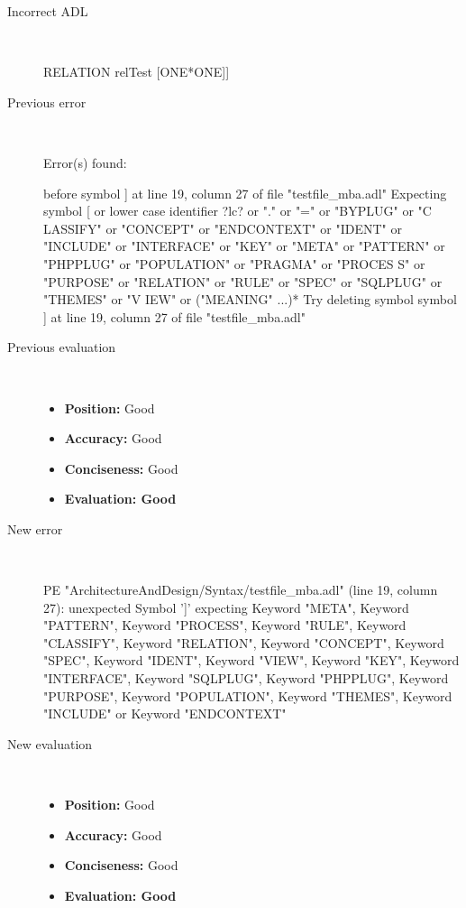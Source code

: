 \begin{description}
  \item[Incorrect ADL]~\\
\begin{adl}
RELATION relTest [ONE*ONE]]\end{adl}
  \item[Previous error]~\\
\begin{haskell}
Error(s) found:

before symbol ] at line 19, column 27 of file "testfile_mba.adl"
Expecting symbol [ or lower case identifier ?lc? or "." or "=" or "BYPLUG" or "C
LASSIFY" or "CONCEPT" or "ENDCONTEXT" or "IDENT" or "INCLUDE" or "INTERFACE" or
"KEY" or "META" or "PATTERN" or "PHPPLUG" or "POPULATION" or "PRAGMA" or "PROCES
S" or "PURPOSE" or "RELATION" or "RULE" or "SPEC" or "SQLPLUG" or "THEMES" or "V
IEW" or ("MEANING" ...)*
Try deleting symbol symbol ] at line 19, column 27 of file "testfile_mba.adl"\end{haskell}
  \item[Previous evaluation]~\\
    \begin{itemize}
    \item \textbf{Position:} Good
    \item \textbf{Accuracy:} Good
    \item \textbf{Conciseness:} Good
    \item \textbf{Evaluation: Good}
    \end{itemize}
  \item[New error]~\\
\begin{haskell}
PE "ArchitectureAndDesign/Syntax/testfile_mba.adl" (line 19, column 27):
unexpected Symbol ']'
expecting Keyword "META", Keyword "PATTERN", Keyword "PROCESS", Keyword "RULE", Keyword "CLASSIFY", Keyword "RELATION", Keyword "CONCEPT", Keyword "SPEC", Keyword "IDENT", Keyword "VIEW", Keyword "KEY", Keyword "INTERFACE", Keyword "SQLPLUG", Keyword "PHPPLUG", Keyword "PURPOSE", Keyword "POPULATION", Keyword "THEMES", Keyword "INCLUDE" or Keyword "ENDCONTEXT"
\end{haskell}
  \item[New evaluation]~\\
    \begin{itemize}
    \item \textbf{Position:} Good
    \item \textbf{Accuracy:} Good
    \item \textbf{Conciseness:} Good
    \item \textbf{Evaluation: Good}
    \end{itemize}
  \end{description}

